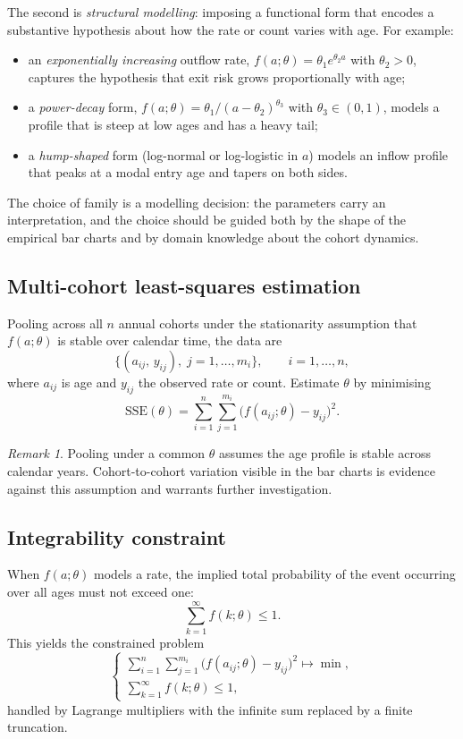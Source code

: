 \documentclass[a4paper,oneside,12pt]{extarticle}
\theoremstyle{plain}
\theoremstyle{definition}
\theoremstyle{remark}
\newtheorem{remark}[proposition]{Remark}
\newcommand*{\les}{\leqslant}
\begin{document}
The second is \emph{structural modelling}: imposing a functional form that
encodes a substantive hypothesis about how the rate or count varies with
age. For example:
\begin{itemize}
\item an \emph{exponentially increasing} outflow rate,
  $f(a;\theta) = \theta_1 e^{\theta_2 a}$ with $\theta_2 > 0$, captures
  the hypothesis that exit risk grows proportionally with age;
\item a \emph{power-decay} form, $f(a;\theta) = \theta_1/(a-\theta_2)^{\theta_3}$
  with $\theta_3 \in (0,1)$, models a profile that is steep at low ages
  and has a heavy tail;
\item a \emph{hump-shaped} form (log-normal or log-logistic in $a$) models
  an inflow profile that peaks at a modal entry age and tapers on both sides.
\end{itemize}
The choice of family is a modelling decision: the parameters carry an
interpretation, and the choice should be guided both by the shape of the
empirical bar charts and by domain knowledge about the cohort dynamics.

\subsection{Multi-cohort least-squares estimation}

Pooling across all $n$ annual cohorts under the stationarity assumption
that $f(a;\theta)$ is stable over calendar time, the data are
\[
\{(a_{ij},\, y_{ij}),\; j = 1,\ldots,m_i\},\qquad i = 1,\ldots,n,
\]
where $a_{ij}$ is age and $y_{ij}$ the observed rate or count. Estimate
$\theta$ by minimising
\[
\mathrm{SSE}(\theta)
= \sum_{i=1}^n \sum_{j=1}^{m_i}
  \bigl(f(a_{ij};\theta) - y_{ij}\bigr)^2.
\]

\begin{remark}
Pooling under a common $\theta$ assumes the age profile is stable across
calendar years. Cohort-to-cohort variation visible in the bar charts is
evidence against this assumption and warrants further investigation.
\end{remark}

\subsection{Integrability constraint}

When $f(a;\theta)$ models a rate, the implied total probability of the
event occurring over all ages must not exceed one:
\[
\sum_{k=1}^{\infty} f(k;\theta) \les 1.
\]
This yields the constrained problem
\[
\begin{cases}
\displaystyle\sum_{i=1}^n \sum_{j=1}^{m_i}
  \bigl(f(a_{ij};\theta) - y_{ij}\bigr)^2 \mapsto \min,\\[6pt]
\displaystyle\sum_{k=1}^{\infty} f(k;\theta) \les 1,
\end{cases}
\]
handled by Lagrange multipliers with the infinite sum replaced by a
finite truncation.
\end{document}
